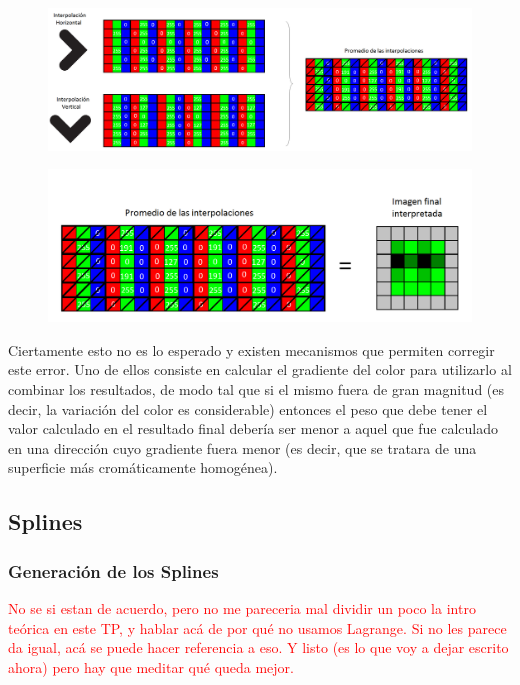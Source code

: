 \documentclass[a4paper]{article}
\begin{document}
\begin{figure}[h!]
	\caption{}
	\begin{center}
\includegraphics[scale=0.26]{imagenes/apxl2}
	\label{apxl2}
  \end{center}
\end{figure}

\begin{figure}[h!]
	\caption{}
	\begin{center}
	\includegraphics[scale=0.36]{imagenes/apxl3}
	\label{apxl3}
  \end{center}
\end{figure}

\newpage
Ciertamente esto no es lo esperado y existen mecanismos que permiten corregir este error. Uno de ellos consiste en calcular el gradiente del color para utilizarlo al combinar los resultados, de modo tal que si el mismo fuera de gran magnitud (es decir, la variación del color es considerable) entonces el peso que debe tener el valor calculado en el resultado final debería ser menor a aquel que fue calculado en una dirección cuyo gradiente fuera menor (es decir, que se tratara de una superficie más cromáticamente homogénea).



\pagebreak

\newpage
\subsection{Splines}
\subsubsection*{Generación de los Splines}
\textcolor{red}{No se si estan de acuerdo, pero no me pareceria mal dividir un poco la intro teórica en este TP, y hablar acá de por qué no usamos Lagrange. Si no les parece da igual, acá se puede hacer referencia a eso. Y listo (es lo que voy a dejar escrito ahora) pero hay que meditar qué queda mejor.}
\end{document}
